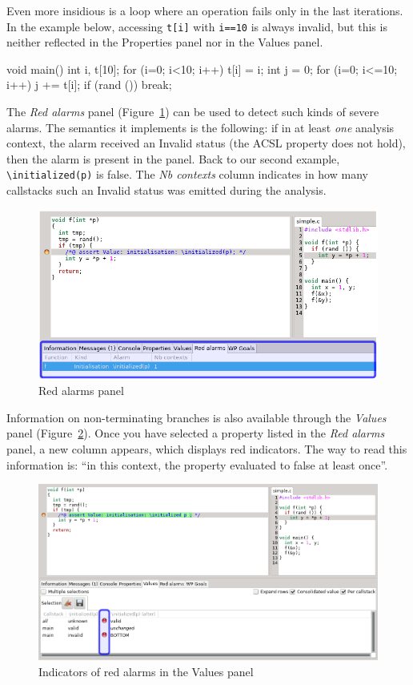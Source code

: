 Even more insidious is a loop where an operation fails only in the last
iterations. In the example below, accessing \lstinline|t[i]| with
\lstinline|i==10| is always invalid, but this is neither reflected
in the Properties panel nor in the Values panel.

\begin{listing-nonumber}
void main() {
  int i, t[10];
  for (i=0; i<10; i++) {
    t[i] = i;
  }
  int j = 0;
  for (i=0; i<=10; i++) {
    j += t[i];
    if (rand ()) break;
  }
}
\end{listing-nonumber}

The {\em Red alarms} panel (Figure~\ref{fig:red-alarms-panel}) can be used to
detect such kinds of severe alarms.
The semantics it implements is the following: if in at least \emph{one}
analysis context, the alarm received an Invalid status (the ACSL property
does not hold), then the alarm is present in the panel.
Back to our second example, \lstinline+\initialized(p)+ is false.
The \emph{Nb contexts} column indicates in how many callstacks such an Invalid
status was emitted during the analysis.

\begin{figure}[htbp]
\centering
\includegraphics[width=\textwidth]{gui-images/gui-red-alarms-panel.png}
\caption{Red alarms panel}
\label{fig:red-alarms-panel}
\end{figure}

Information on non-terminating branches is also available through
the \emph{Values} panel (Figure~\ref{fig:red-values}). Once you have selected
a property listed in the \emph{Red alarms} panel, a new column appears,
which displays red indicators.
The way to read this information is: ``in this context,
the property evaluated to false at least once''.

\begin{figure}[htbp]
\centering
\includegraphics[width=\textwidth]{gui-images/gui-red-values.png}
\caption{Indicators of red alarms in the Values panel}
\label{fig:red-values}
\end{figure}



